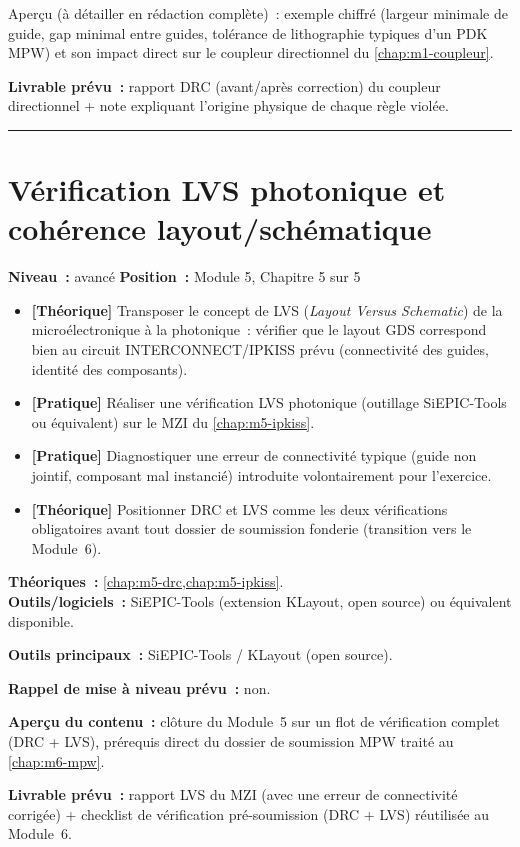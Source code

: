 \begin{flotfonderie}
Aperçu (à détailler en rédaction complète)~: exemple chiffré (largeur minimale de guide, gap minimal entre guides, tolérance de lithographie typiques d'un PDK MPW) et son impact direct sur le coupleur directionnel du \cref{chap:m1-coupleur}.
\end{flotfonderie}

\noindent\textbf{Livrable prévu~:} rapport DRC (avant/après correction) du coupleur directionnel + note expliquant l'origine physique de chaque règle violée.

\bigskip\hrule\bigskip

\chapter{Vérification LVS photonique et cohérence layout/schématique}
\label{chap:m5-lvs}

\noindent\textbf{Niveau~:} avancé \hfill \textbf{Position~:} Module 5, Chapitre 5 sur 5

\begin{objectifs}
\begin{itemize}[leftmargin=1.4em]
  \item \textbf{[Théorique]} Transposer le concept de LVS (\emph{Layout Versus Schematic}) de la microélectronique à la photonique~: vérifier que le layout GDS correspond bien au circuit INTERCONNECT/IPKISS prévu (connectivité des guides, identité des composants).
  \item \textbf{[Pratique]} Réaliser une vérification LVS photonique (outillage SiEPIC-Tools ou équivalent) sur le MZI du \cref{chap:m5-ipkiss}.
  \item \textbf{[Pratique]} Diagnostiquer une erreur de connectivité typique (guide non jointif, composant mal instancié) introduite volontairement pour l'exercice.
  \item \textbf{[Théorique]} Positionner DRC et LVS comme les deux vérifications obligatoires avant tout dossier de soumission fonderie (transition vers le Module~6).
\end{itemize}
\end{objectifs}

\begin{prerequis}
\textbf{Théoriques~:} \cref{chap:m5-drc,chap:m5-ipkiss}.\\
\textbf{Outils/logiciels~:} SiEPIC-Tools (extension KLayout, open source) ou équivalent disponible.
\end{prerequis}

\noindent\textbf{Outils principaux~:} SiEPIC-Tools / KLayout (open source).

\noindent\textbf{Rappel de mise à niveau prévu~:} non.

\noindent\textbf{Aperçu du contenu~:} clôture du Module~5 sur un flot de vérification complet (DRC + LVS), prérequis direct du dossier de soumission MPW traité au \cref{chap:m6-mpw}.

\noindent\textbf{Livrable prévu~:} rapport LVS du MZI (avec une erreur de connectivité corrigée) + checklist de vérification pré-soumission (DRC + LVS) réutilisée au Module~6.

